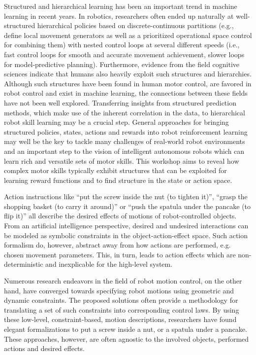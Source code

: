 \begin{spacing}{1.0}
{Structured and hierarchical learning has been an important trend in machine learning in recent years. In robotics, researchers often ended up naturally at well-structured hierarchical policies based on discrete-continuous partitions (e.g., define local movement generators as well as a prioritized operational space control for combining them) with nested control loops at several different speeds (i.e., fast control loops for smooth and accurate movement achievement, slower loops for model-predictive planning). Furthermore, evidence from the field cognitive sciences indicate that humans also heavily exploit such structures and hierarchies. Although such structures have been found in human motor control, are favored in robot control and exist in machine learning, the connections between these fields have not been well explored. Transferring insights from structured prediction methods, which make use of the inherent correlation in the data, to hierarchical robot skill learning may be a crucial step. General 
approaches for bringing structured policies, states, actions and rewards into robot reinforcement learning may well be the key to tackle many challenges of real-world robot environments and an important step to the vision of intelligent autonomous robots which can learn rich and versatile sets of motor skills. This workshop aims to reveal how complex motor skills typically exhibit structures that can be exploited for learning reward functions and to find structure in the state or action space. 
}



{
Action instructions like ``put the screw inside the nut (to tighten it)'', ``grasp the shopping basket (to carry it around)” or ``push the spatula under the pancake (to flip it)” all describe the desired effects of motions of robot-controlled objects. From an artificial intelligence perspective, desired and undesired interactions can be modeled as symbolic constraints in the object-action-effect space. Such action formalism do, however, abstract away from how actions are performed, e.g. chosen movement parameters. This, in turn, leads to action effects which are non-deterministic and inexplicable for the high-level system.

Numerous research endeavors in the field of robot motion control, on the other hand, have converged towards specifying robot motions using geometric and dynamic constraints. The proposed solutions often provide a methodology for translating a set of such constraints into corresponding control laws. By using these low-level, constraint-based, motion descriptions, researchers have found elegant formalizations to put a screw inside a nut, or a spatula under a pancake. These approaches, however, are often agnostic to the involved objects, performed actions and desired effects.

}
\end{spacing}
